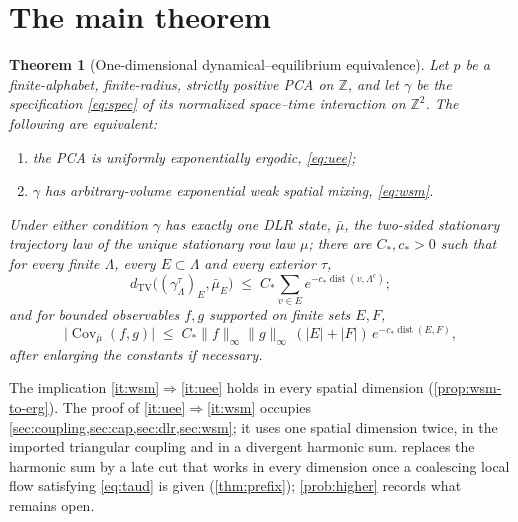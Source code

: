 \documentclass[11pt]{article}
\theoremstyle{plain}
\newtheorem{theorem}{Theorem}[section]
\theoremstyle{definition}
\theoremstyle{remark}
\newcommand{\Z}{\mathbb{Z}}
\newcommand{\dtv}{d_{\mathrm{TV}}}
\newcommand{\Lam}{\Lambda}
\newcommand{\ba}{\bar{\mu}}
\newcommand{\dist}{\operatorname{dist}}
\newcommand{\Cov}{\operatorname{Cov}}
\begin{document}
\section{The main theorem}
\label{sec:results}

\begin{theorem}[One-dimensional dynamical--equilibrium equivalence]
\label{thm:main}
Let $p$ be a finite-alphabet, finite-radius, strictly positive PCA on $\Z$, and let $\gamma$ be the specification \eqref{eq:spec} of its normalized space--time interaction on $\Z^2$. The following are equivalent:
\begin{enumerate}[label=(\roman*)]
\item\label{it:uee} the PCA is uniformly exponentially ergodic, \eqref{eq:uee};
\item\label{it:wsm} $\gamma$ has arbitrary-volume exponential weak spatial mixing, \eqref{eq:wsm}.
\end{enumerate}
Under either condition $\gamma$ has exactly one DLR state, $\ba$, the two-sided stationary trajectory law of the unique stationary row law $\mu$; there are $C_*,c_*>0$ such that for every finite $\Lam$, every $E\subset\Lam$ and every exterior $\tau$,
\begin{equation}
\dtv\bigl((\gamma^\tau_\Lam)_E,\ba_E\bigr)\;\le\;C_*\sum_{v\in E}e^{-c_*\dist(v,\Lam^c)};
\label{eq:conv}
\end{equation}
and for bounded observables $f,g$ supported on finite sets $E,F$,
\begin{equation}
\bigl|\Cov_{\ba}(f,g)\bigr|\;\le\;C_*\|f\|_\infty\|g\|_\infty\,(|E|+|F|)\,e^{-c_*\dist(E,F)},
\label{eq:cluster}
\end{equation}
after enlarging the constants if necessary.
\end{theorem}

The implication \ref{it:wsm}$\Rightarrow$\ref{it:uee} holds in every spatial dimension (\cref{prop:wsm-to-erg}). The proof of \ref{it:uee}$\Rightarrow$\ref{it:wsm} occupies \cref{sec:coupling,sec:cap,sec:dlr,sec:wsm}; it uses one spatial dimension twice, in the imported triangular coupling and in a divergent harmonic sum.  replaces the harmonic sum by a late cut that works in every dimension once a coalescing local flow satisfying \eqref{eq:taud} is given (\cref{thm:prefix}); \cref{prob:higher} records what remains open.
\end{document}
